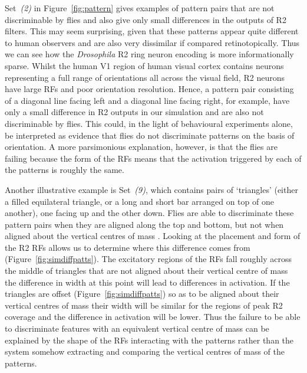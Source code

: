 \documentclass[10pt]{article}
\begin{document}
Set~\emph{(2)} in Figure~\ref{fig:pattern} gives examples of pattern pairs that are not discriminable by flies and also give only small differences in the outputs of R2 filters. This may seem surprising, given that these patterns appear quite different to human observers and are also very dissimilar if compared retinotopically. Thus we can see how the \emph{Drosophila} R2 ring neuron encoding is more informationally sparse. Whilst the human V1 region of human visual cortex contains neurons representing a full range of orientations all across the visual field, R2 neurons have large RFs and poor orientation resolution. Hence, a pattern pair consisting of a diagonal line facing left and a diagonal line facing right, for example, have only a small difference in R2 outputs in our simulation and are also not discriminable by flies.
This could, in the light of behavioural experiments alone, be interpreted as evidence that flies do not discriminate patterns on the basis of orientation.
A more parsimonious explanation, however, is that the flies are failing because the form of the \acp{RF} means that the activation triggered by each of the patterns is roughly the same.

Another illustrative example is Set~\emph{(9)}, which contains pairs of `triangles' (either a filled equilateral triangle, or a long and short bar arranged on top of one another), one facing up and the other down.
Flies are able to discriminate these pattern pairs when they are aligned along the top and bottom, but not when aligned about the vertical centres of mass \cite{Ernst1999}. Looking at the placement and form of the R2 RFs allows us to determine where this difference comes from (Figure~\ref{fig:simdiffpatts}).
The excitatory regions of the RFs fall roughly across the middle of triangles that are not aligned about their vertical centre of mass the difference in width at this point will lead to differences in activation. If the triangles are offset (Figure~\ref{fig:simdiffpatts}) so as to be aligned about their vertical centres of mass their width will be similar for the regions of peak R2 coverage and the difference in activation will be lower.
Thus the failure to be able to discriminate features with an equivalent vertical centre of mass can be explained by the shape of the RFs interacting with the patterns rather than the system somehow extracting and comparing the vertical centres of mass of the patterns.
\end{document}

